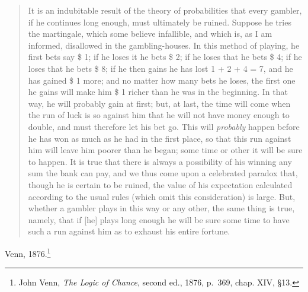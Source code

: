 \documentclass{article}
\theoremstyle{definition}
\begin{document}
\begin{quote}
It is an indubitable result of the theory of probabilities that every gambler, if he continues long enough, must ultimately be ruined. Suppose he tries the martingale, which some believe infallible, and which is, as I am informed, disallowed in the gambling-houses.
In this method of playing, he first bets say \$ 1; if he loses it he bets \$ 2; if he loses that he bets \$ 4; if he loses that he bets \$ 8; if he then gains he has lost 1 + 2 + 4 = 7,
and he has gained \$ 1 more; and no matter how many bets he loses, the first one he gains will make him \$ 1 richer than he was in the beginning. In that way,
he will probably gain at first; but, at last, the time will come when the run of luck is so against him that he will not have money enough to double, and must therefore let his bet go. This will {\em probably} happen before he has won as much as he had in the first place, so that this run against him will leave him poorer than he began; some time or other it will be sure to happen. It is true that there is always a possibility of his winning any sum the bank can pay, and we thus come upon a celebrated paradox that, though he is certain to be ruined, the value of his expectation calculated according to the usual rules (which omit this consideration) is large. But, whether a gambler plays in this way or any other, the same thing is true, namely, that if [he] plays long enough he will be sure some time to have such a run against him as to exhaust his entire fortune.
\end{quote}

Venn, 1876.\footnote{John Venn, {\em The Logic of Chance}, second ed., 1876, p.~369, chap. XIV, \S 13.}
\end{document}
